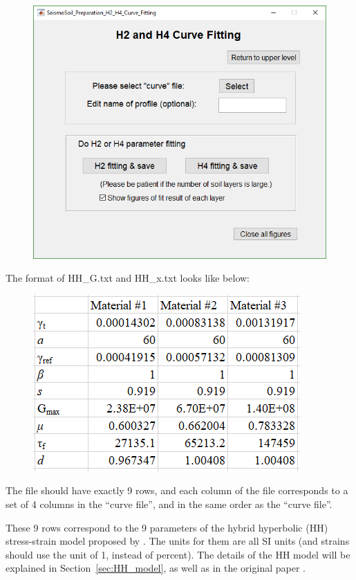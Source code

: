 \documentclass[11pt,letterpaper]{article}
\begin{document}
\begin{figure}[H]
\centering
  \includegraphics[width=.83\textwidth]{nonlinear_curve_fitting.png}\\
\end{figure}

The format of \textsf{HH\_G.txt} and \textsf{HH\_x.txt} looks like below:

\begin{figure}[H]
    \centering
    \includegraphics[width=.53\textwidth]{HH_G_format.png}\\
\end{figure}

The file should have exactly 9 rows, and each column of the file corresponds to a set of 4 columns in the ``curve file'', and in the same order as the ``curve file''.

These 9 rows correspond to the 9 parameters of the hybrid hyperbolic (HH) stress-strain model proposed by \cite{Shi_Asimaki_2017}. The units for them are all SI units (and strains should use the unit of 1, instead of percent). The details of the HH model will be explained in Section~\ref{sec:HH_model}, as well as in the original paper \citep{Shi_Asimaki_2017}.
\end{document}
